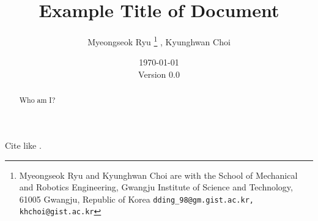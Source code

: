 \documentclass{article}
\title{
    Example Title of Document
}
\author{
    Myeongseok Ryu
    \thanks{Myeongseok Ryu and Kyunghwan Choi are with the School of Mechanical and Robotics Engineering, Gwangju Institute of Science and Technology, 61005 Gwangju, Republic of Korea {\tt\small dding\_98@gm.gist.ac.kr, khchoi@gist.ac.kr}}%
    ,
    Kyunghwan Choi
    \footnotemark[1]
}
\date{
    \today
    \\
    Version 0.0
}
\newcommand*{\template}{../template}
\begin{document}
\maketitle

\begin{abstract}
    Who am I?
\end{abstract}

\tableofcontents



Cite like \cite{Khalil:2002aa}.





\begin{appendices}

\end{appendices}



\end{document}
